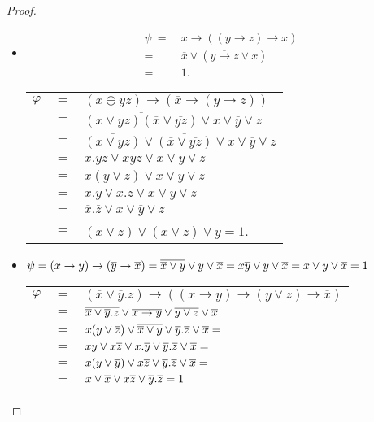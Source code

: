 \begin{proof}
  \begin{itemize}
  \item
    \begin{align*}
      \psi\ =\ & x\rightarrow ((y\rightarrow z)\rightarrow x)\\ 
      =\ & \overline{x}\vee (\overline{y\rightarrow z}\vee x) \\
      =\ & 1.
    \end{align*}
    
    \begin{tabular}{l c l}
      $\varphi $ & $ =$ & $(x\oplus yz)\rightarrow (\overline{x}\rightarrow (y\rightarrow z))$\\
      & $=$ & $ \overline{(x\vee yz)(\overline{x}\vee\overline{yz})} \vee x\vee \overline{y}\vee z$\\
      & $=$ & $\overline{(x\vee yz)}\vee\overline{(\overline{x}\vee\overline{yz})} \vee x\vee \overline{y}\vee z$\\
      & $=$ & $\overline{x}.\overline{yz} \vee xyz \vee x\vee \overline{y}\vee z$\\
      & $=$ & $\overline{x}(\overline{y}\vee\overline{z}) \vee x\vee \overline{y}\vee z$\\
      & $=$ & $\overline{x}.\overline{y} \vee \overline{x}.\overline{z} \vee x\vee \overline{y}\vee z$\\
      & $=$ & $\overline{x}.\overline{z} \vee x\vee \overline{y}\vee z$\\
      & $=$ & $\overline{(x\vee z)} \vee (x\vee z)\vee \overline{y} = 1$.
    \end{tabular}
  \item
    $\psi = (x\rightarrow y)\rightarrow(\overline{y}\rightarrow\overline{x}) = 
    \overline{\overline{x}\vee y} \vee y \vee \overline{x} = x\overline{y} \vee y \vee \overline{x} = x \vee y \vee \overline{x} = 1$
    
    \begin{tabular}{l c l}
      $\varphi $ & $=$ & $(\overline{x}\vee \overline{y}.z)\rightarrow ((x\rightarrow y)\rightarrow (y\vee z)\rightarrow\overline{x}) $\\
      & $ = $ & $\overline{\overline{x}\vee \overline{y}.z} \vee \overline{x\rightarrow y} \vee \overline{y\vee z} \vee \overline{x}$ \\
      & $=$ & $x(y\vee \overline{z})\vee \overline{\overline{x}\vee y} \vee \overline{y}.\overline{z} \vee \overline{x} = $\\
      & $=$ & $xy \vee x\overline{z} \vee x.\overline{y} \vee \overline{y}.\overline{z} \vee \overline{x} =$ \\
      & $=$ & $x(y\vee\overline{y}) \vee x\overline{z} \vee \overline{y}.\overline{z} \vee \overline{x} = $\\
      & $=$ & $x \vee \overline{x} \vee x\overline{z} \vee \overline{y}.\overline{z} = 1$
    \end{tabular}
    

\end{itemize}
\end{proof}
